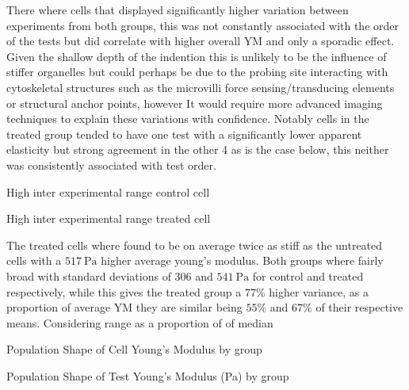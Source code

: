 \documentclass[
  paper=a4,
  ,captions=tableheading
]{scrartcl}
\makeatletter
\newcommand*\pandocbounded[1]{%
  \sbox\pandoc@box{#1}%
  \Gscale@div\@tempa{\textheight}{\dimexpr\ht\pandoc@box+\dp\pandoc@box\relax}%
  \Gscale@div\@tempb{\linewidth}{\wd\pandoc@box}%
  \ifdim\@tempb\p@<\@tempa\p@\let\@tempa\@tempb\fi%
  \ifdim\@tempa\p@<\p@\scalebox{\@tempa}{\usebox\pandoc@box}%
  \else\usebox{\pandoc@box}%
  \fi%
}
\renewenvironment{quote}{\begin{customblockquote}\list{}{\rightmargin=0em\leftmargin=0em}%
\item\relax\color{blockquote-text}\ignorespaces}{\unskip\unskip\endlist\end{customblockquote}}
\makeatother
\begin{document}
There where cells that displayed significantly higher variation between
experiments from both groups, this was not constantly associated with
the order of the tests but did correlate with higher overall YM and only
a sporadic effect. Given the shallow depth of the indention this is
unlikely to be the influence of stiffer organelles but could perhaps be
due to the probing site interacting with cytoskeletal structures such as
the microvilli force sensing/transducing elements or structural anchor
points, however It would require more advanced imaging techniques to
explain these variations with confidence. Notably cells in the treated
group tended to have one test with a significantly lower apparent
elasticity but strong agreement in the other 4 as is the case below,
this neither was consistently associated with test order.

\noindent
\begin{minipage}[t]{0.48\textwidth}
\begin{quote}
\pandocbounded{}
High inter experimental range control cell
\end{quote}
\end{minipage}
\hfill
\begin{minipage}[t]{0.48\textwidth}
\begin{quote}
\pandocbounded{}
High inter experimental range treated cell
\end{quote}
\end{minipage}

The treated cells where found to be on average twice as stiff as the
untreated cells with a \(517 \ \text{Pa}\) higher average young's
modulus. Both groups where fairly broad with standard deviations of
\(306\) and \(541 \ \text{Pa}\) for control and treated respectively,
while this gives the treated group a \(77\%\) higher variance, as a
proportion of average YM they are similar being \(55\%\) and \(67\%\) of
their respective means. Considering range as a proportion of of median

\noindent
\begin{minipage}[t]{0.48\textwidth}
\begin{quote}
\pandocbounded{}
Population Shape of Cell Young's Modulus by group
\end{quote}
\end{minipage}
\hfill
\begin{minipage}[t]{0.48\textwidth}
\begin{quote}
\pandocbounded{}
Population Shape of Test Young's Modulus (Pa) by group
\end{quote}
\end{minipage}
\end{document}
